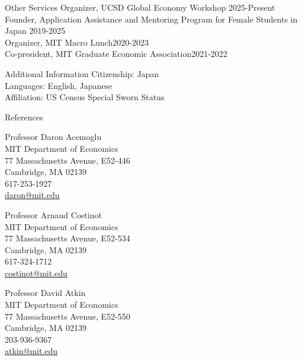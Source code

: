 \documentclass{resume} %
\begin{document}
\begin{rSection}{Other Services}
Organizer, UCSD Global Economy Workshop \hfill 2025-Present\\
Founder, Application Assistance and Mentoring Program for Female Students in Japan \hfill 2019-2025\\
Organizer, MIT Macro Lunch\hfill 2020-2023\\
Co-president, MIT Graduate Economic Association\hfill 2021-2022
\end{rSection}

\begin{rSection}{Additional Information}
Citizenship: Japan \\
Languages: English, Japanese \\
Affiliation: US Census Special Sworn Status
\end{rSection}

\clearpage
\begin{rSection}{References}
\begin{minipage}[t]{0.48\linewidth}
Professor Daron Acemoglu\\
MIT Department of Economics\\
77 Massachusetts Avenue, E52-446\\
Cambridge, MA 02139\\
617-253-1927\\
\href{mailto:daron@mit.edu}{daron@mit.edu}
\end{minipage}\hfill
\begin{minipage}[t]{0.48\linewidth}
Professor Arnaud Costinot\\
MIT Department of Economics\\
77 Massachusetts Avenue, E52-534\\
Cambridge, MA 02139\\
617-324-1712\\
\href{mailto:costinot@mit.edu}{costinot@mit.edu}
\end{minipage}

\medskip
\begin{minipage}[t]{0.48\linewidth}
Professor David Atkin\\
MIT Department of Economics\\
77 Massachusetts Avenue, E52-550\\
Cambridge, MA 02139\\
203-936-9367\\
\href{mailto:atkin@mit.edu}{atkin@mit.edu}
\end{minipage}
\end{rSection}
\end{document}
